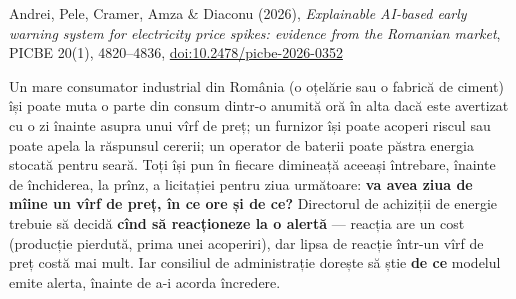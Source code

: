 
\renewcommand{\emqacase}{\T{Research case 7 (Lecture 7)}{Studiul de caz 7 (cursul 7)}}

%
          { Andrei, Pele, Cramer, Amza \& Diaconu (2026), \emph{Explainable AI-based early warning system for electricity price spikes: evidence from the Romanian market},
           PICBE 20(1), 4820--4836, \href{https://doi.org/10.2478/picbe-2026-0352}{doi:10.2478/picbe-2026-0352}}

\begin{scenario}
%
{Un mare consumator industrial din România (o oțelărie sau o fabrică de ciment) își poate muta o parte din consum dintr-o anumită oră în alta dacă este avertizat cu o zi înainte asupra unui vîrf de preț; un furnizor își poate acoperi riscul sau poate apela la răspunsul cererii; un operator de baterii poate păstra energia stocată pentru seară.
Toți își pun în fiecare dimineață aceeași întrebare, înainte de închiderea, la prînz, a licitației pentru ziua următoare: \textbf{va avea ziua de mîine un vîrf de preț, în ce ore și de ce?}
Directorul de achiziții de energie trebuie să decidă \textbf{cînd să reacționeze la o alertă} --- reacția are un cost (producție pierdută, prima unei acoperiri), dar lipsa de reacție într-un vîrf de preț costă mai mult.
Iar consiliul de administrație dorește să știe \textbf{de ce} modelul emite alerta, înainte de a-i acorda încredere.}
\end{scenario}

